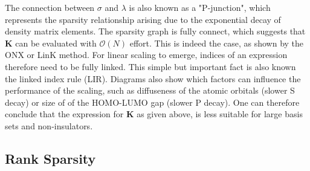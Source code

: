 \noindent The connection between $\sigma$ and $\lambda$ is also known as a "P-junction", which represents the sparsity relationship arising due to the exponential decay of density matrix elements. The sparsity graph is fully connect, which suggests that $\mathbf{K}$ can be evaluated with $\mathcal{O}(N)$ effort. This is indeed the case, as shown by the ONX or LinK method. For linear scaling to emerge, indices of an expression therefore need to be fully linked. This simple but important fact is also known the linked index rule (LIR). Diagrams also show which factors can influence the performance of the scaling, such as diffuseness of the atomic orbitals (slower S decay) or size of of the HOMO-LUMO gap (slower P decay). One can therefore conclude that the expression for $\mathbf{K}$ as given above, is less suitable for large basis sets and non-insulators.

\subsection{Rank Sparsity}

